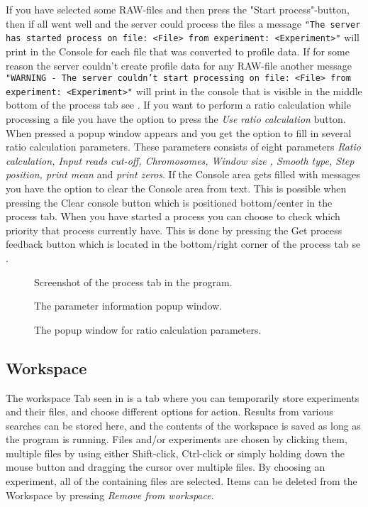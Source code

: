 If you have selected some RAW-files and then press the "Start process"-button, then if all went well and the server could process the files a message \texttt{"The server has started process on file: <File> from experiment: <Experiment>"} will print in the Console for each file that was converted to profile data. If for some reason the server couldn't create profile data for any RAW-file another message \texttt{"WARNING - The server couldn't start processing on file: <File> from experiment: <Experiment>"} will print in the console that is visible in the middle bottom of the process tab see . If you want to perform a ratio calculation while processing a file you have the option to press the \emph{Use ratio calculation} button. When pressed a popup window appears and you get the option to fill in several ratio calculation parameters. These parameters consists of eight parameters \emph{Ratio calculation, Input reads cut-off, Chromosomes, Window size , Smooth type, Step position, print mean} and  \emph{print zeros}. If the Console area gets filled with messages you have the option to clear the Console area from text. This is possible when pressing the Clear console button which is positioned bottom/center in the process tab. When you have started a process you can choose to check which priority that process currently have. This is done by pressing the Get process feedback button which is located in the bottom/right corner of the process tab se .




\begin{figure}[htb]
	\caption{Screenshot of the process tab in the program.}
	\label{fig:des_process-view}
\end{figure}

\begin{figure}[htb]
	\caption{The parameter information popup window.}
	\label{fig:des_process-view-info}
\end{figure}

\begin{figure}[htb]
	\caption{The popup window for ratio calculation parameters.}
	\label{fig:des_process-view-ratio}
\end{figure}

\FloatBarrier

\subsection{Workspace} \label{sec:des_workspace}
The workspace Tab seen in  is a tab where you can temporarily store experiments and their files, and choose different options for action. Results from various searches can be stored here, and the contents of the workspace is saved as long as the program is running. Files and/or experiments are chosen by clicking them, multiple files by using either Shift-click, Ctrl-click or simply holding down the mouse button and dragging the cursor over multiple files. By choosing an experiment, all of the containing files are selected. Items can be deleted from the Workspace by pressing \emph{Remove from workspace}.

